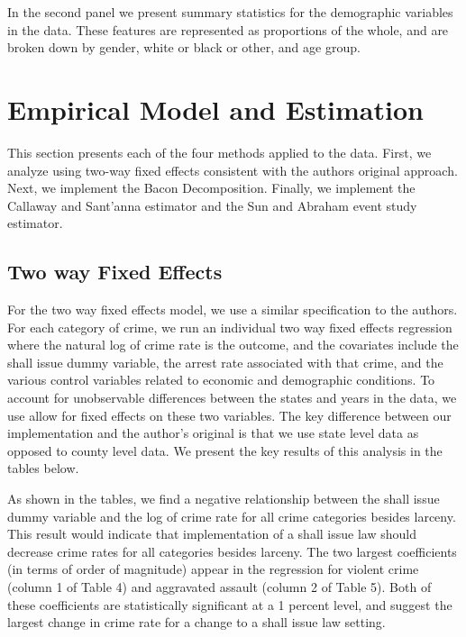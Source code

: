 \documentclass{article}
\begin{document}


In the second panel we present summary statistics for the demographic variables in the data. These features are represented as proportions of the whole, and are broken down by gender, white or black or other, and age group. 

\section{Empirical Model and Estimation}

This section presents each of the four methods applied to the data. First, we analyze using two-way fixed effects consistent with the authors original approach. Next, we implement the Bacon Decomposition. Finally, we implement the Callaway and Sant'anna estimator  and the Sun and Abraham event study estimator.

\subsection{Two way Fixed Effects}

For the two way fixed effects model, we use a similar specification to the authors. For each category of crime, we run an individual two way fixed effects regression where the natural log of crime rate is the outcome, and the covariates include the shall issue dummy variable, the arrest rate associated with that crime, and the various control variables related to economic and demographic conditions. To account for unobservable differences between the states and years in the data, we use allow for fixed effects on these two variables. The key difference between our implementation and the author's original is that we use state level data as opposed to county level data. We present the key results of this analysis in the tables below.







As shown in the tables, we find a negative relationship between the shall issue dummy variable and the log of crime rate for all crime categories besides larceny. This result would indicate that implementation of a shall issue law should decrease crime rates for all categories besides larceny. The two largest coefficients (in terms of order of magnitude) appear in the regression for violent crime (column 1 of Table 4) and aggravated assault (column 2 of Table 5). Both of these coefficients are statistically significant at a 1 percent level, and suggest the largest change in crime rate for a change to a shall issue law setting.
\end{document}
